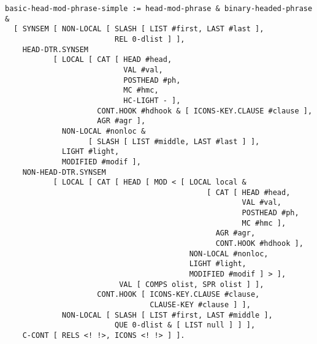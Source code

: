 \documentclass[a4paper]{article}
\begin{document}
{\small\begin{verbatim}
basic-head-mod-phrase-simple := head-mod-phrase & binary-headed-phrase &
  [ SYNSEM [ NON-LOCAL [ SLASH [ LIST #first, LAST #last ],
                         REL 0-dlist ] ],
    HEAD-DTR.SYNSEM 
           [ LOCAL [ CAT [ HEAD #head,
                           VAL #val,
                           POSTHEAD #ph,
                           MC #hmc,
                           HC-LIGHT - ],
                     CONT.HOOK #hdhook & [ ICONS-KEY.CLAUSE #clause ],
                     AGR #agr ],
             NON-LOCAL #nonloc &
                   [ SLASH [ LIST #middle, LAST #last ] ],
             LIGHT #light,
             MODIFIED #modif ],
    NON-HEAD-DTR.SYNSEM 
           [ LOCAL [ CAT [ HEAD [ MOD < [ LOCAL local & 
                                              [ CAT [ HEAD #head,
                                                      VAL #val,
                                                      POSTHEAD #ph,
                                                      MC #hmc ],
                                                AGR #agr,
                                                CONT.HOOK #hdhook ],
                                          NON-LOCAL #nonloc,
                                          LIGHT #light,
                                          MODIFIED #modif ] > ],
                          VAL [ COMPS olist, SPR olist ] ],
                     CONT.HOOK [ ICONS-KEY.CLAUSE #clause,
                                 CLAUSE-KEY #clause ] ],
             NON-LOCAL [ SLASH [ LIST #first, LAST #middle ],
                         QUE 0-dlist & [ LIST null ] ] ],
    C-CONT [ RELS <! !>, ICONS <! !> ] ].
\end{verbatim}}
\end{document}
